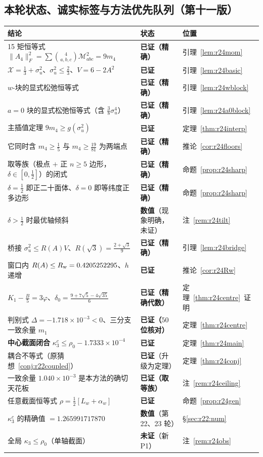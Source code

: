\documentclass[UTF8,11pt]{ctexart}
\theoremstyle{definition}
\begin{document}
\subsection{本轮状态、诚实标签与方法优先队列（第十一版）}\label{sec:r24:status}

\begin{center}\small
\begin{tabular}{lll}
\toprule
结论 & 状态 & 位置\\
\midrule
15 矩恒等式 $\|A_4\|_F^2=\sum\binom{4}{a,b,c}\mathcal{M}_{abc}^2=9m_4$ & \textbf{已证（精确）} & 引理~\ref{lem:r24mom}\\
$\mathcal{X}=\frac13+\sigma_u^2$、$\sigma_u^2\le\frac23$、$V=6-2A^2$ & \textbf{已证} & 引理~\ref{lem:r24basic}\\
$w$-块的显式松弛恒等式 & \textbf{已证（精确）} & 引理~\ref{lem:r24wblock}\\
$a{=}0$ 块的显式松弛恒等式（含 $\frac38\sigma_u^4$） & \textbf{已证（精确）} & 引理~\ref{lem:r24a0block}\\
主插值定理 $9m_4\ge g(\sigma_u^2)$ & \textbf{已证} & 定理~\ref{thm:r24interp}\\
它同时含 $m_4\ge\frac15$ 与 $m_4\ge\frac{19}{81}$ 为两端点 & \textbf{已证（精确）} & 推论~\ref{cor:r24floors}\\
取等族（极点 $+$ 正 $n\ge5$ 边形，$\delta\in[0,\frac12]$）的闭式 & \textbf{已证（精确）} & 命题~\ref{prop:r24sharp}\\
$\delta=\frac12$ 即正二十面体、$\delta=0$ 即等纬度正多边形 & \textbf{已证（精确）} & 命题~\ref{prop:r24sharp}\\
$\delta>\frac12$ 时最优轴倾斜 & \textbf{数值}（现象明确，未证） & 注~\ref{rem:r24tilt}\\
桥接 $\sigma_u^2\le R(A)V$、$R(\sqrt3)=\frac{2+\sqrt3}9$ & \textbf{已证（精确）} & 引理~\ref{lem:r24bridge}\\
窗口内 $R(A)\le R_{\rm w}=0.4205252295$、$h$ 递增 & \textbf{已证} & 推论~\ref{cor:r24Rw}\\
$K_1-\frac B5=3\varphi$、$\delta_0=\frac{9+7\sqrt5-4\sqrt{35}}6$ & \textbf{已证（精确代数）} & 定理~\ref{thm:r24centre}~证明\\
判别式 $\Delta=-1.718\times10^{-3}<0$、三分支一致余量 $m_1$ & \textbf{已证（$50$ 位核对）} & 定理~\ref{thm:r24centre}\\
\textbf{中心截面闭合} $\kappa_3^c\le\rho_0-1.7333\times10^{-4}$ & \textbf{已证} & 定理~\ref{thm:r24main}\\
耦合不等式（原猜想~\ref{conj:r22coupled}） & \textbf{已证}（升级为定理） & 定理~\ref{thm:r24conj}\\
一致余量 $1.040\times10^{-3}$ 是本方法的确切天花板 & \textbf{已证（取等族）} & 注~\ref{rem:r24ceiling}\\
任意截面恒等式 $\rho=\frac12[L_w+\alpha_w]$ & \textbf{已证} & 命题~\ref{prop:r24gen}\\
$\kappa_3^c$ 的精确值 $=1.265991717870$ & \textbf{数值}（第 22、23 轮） & \S\ref{sec:r22:num}\\
全局 $\kappa_3\le\rho_0$（单轴截面） & \textbf{未证}（新 P1） & 注~\ref{rem:r24obs}\\
\bottomrule
\end{tabular}
\end{center}
\end{document}
